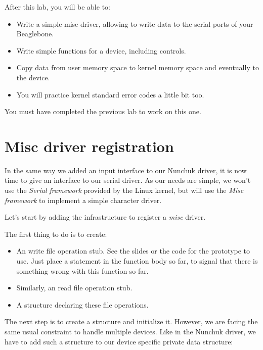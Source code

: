 
After this lab, you will be able to:

\begin{itemize}
\item Write a simple misc driver, allowing to write data to the
  serial ports of your Beaglebone.
\item Write simple  functions for a device,
  including  controls.
\item Copy data from user memory space to kernel memory space and
  eventually to the device.
\item You will practice kernel standard error codes a little bit too.
\end{itemize}

You must have completed the previous lab to work on this one. 

\section{Misc driver registration}

In the same way we added an input interface to our Nunchuk driver, it is
now time to give an interface to our serial driver. As our needs are
simple, we won't use the {\em Serial framework} provided by the Linux
kernel, but will use the {\em Misc framework} to implement a simple
character driver.

Let's start by adding the infrastructure to register a {\em misc}
driver.

The first thing to do is to create:

\begin{itemize}
\item An  write file operation stub.
      See the slides or the code for the prototype to use.
      Just place a  statement in the function
      body so far, to signal that there is something wrong with this
      function so far.
\item Similarly, an  read file operation stub.
\item A  structure declaring these file
      operations.
\end{itemize}

The next step is to create a  structure and initialize
it. However, we are facing the same usual constraint to handle multiple
devices. Like in the Nunchuk driver, we have to add such a structure
to our device specific private data structure:

